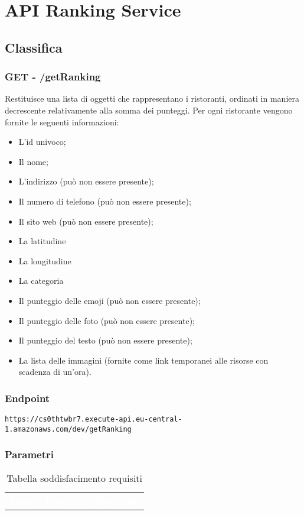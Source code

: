 \section{API Ranking Service}

\subsection{Classifica}

\subsubsection{GET - /getRanking}
Restituisce una lista di oggetti che rappresentano i ristoranti, ordinati in maniera decrescente relativamente alla somma dei punteggi. Per ogni ristorante vengono fornite le seguenti informazioni:
\begin{itemize}
	\item L'id univoco;
    \item Il nome;
    \item L'indirizzo (può non essere presente);
    \item Il numero di telefono (può non essere presente);
    \item Il sito web (può non essere presente);
    \item La latitudine
    \item La longitudine
    \item La categoria 
    \item Il punteggio delle emoji (può non essere presente);
    \item Il punteggio delle foto (può non essere presente);
    \item Il punteggio del testo (può non essere presente);
	\item La lista delle immagini (fornite come link temporanei alle risorse con scadenza di un'ora).
\end{itemize}

\subsubsection{Endpoint}
\texttt{https://cs0thtwbr7.execute-api.eu-central-1.amazonaws.com/dev/getRanking}

\subsubsection{Parametri}
\begin{table}[!htbp]
\renewcommand{\arraystretch}{1.5}

\begin{tabular}[t]{ m{}<{\centering}  m{}<{\centering} m{}<{\centering}}
	\rowcolor{darkblue}
	\textcolor{white}{\textbf{Fonte}} &\textcolor{white}{\textbf{Requisiti}} &\textcolor{white}{\textbf{Requisiti}}\\ 

\end{tabular}


\caption{Tabella soddisfacimento requisiti}
\end{table}